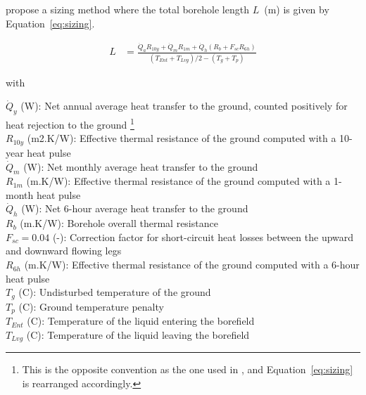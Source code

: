 \cite{Kavanaugh2014} propose a sizing method where the total borehole length $L$~(m) is given by Equation~\ref{eq:sizing}.

\begin{align}
    \label{eq:sizing}
    L &= \frac{\dot{Q}_a R_{10y} + \dot{Q}_m R_{1m} + \dot{Q}_h \left( R_b + F_{sc} R_{6h} \right)}{\left( T_{Ent} + T_{Lvg} \right) / 2 - \left( T_g + T_p \right)}
\end{align}

with

\begin{avec}
    $\dot{Q}_y$ (W): Net annual average heat transfer to the ground, counted positively for heat rejection to the ground%
    \footnote{This is the opposite convention as the one used in \cite{Kavanaugh2014}, and Equation~\ref{eq:sizing} is rearranged accordingly.}\\
    $R_{10y}$ (m2.K/W): Effective thermal resistance of the ground computed with a 10-year heat pulse \\
    $\dot{Q}_m$ (W): Net monthly average heat transfer to the ground\\
    $R_{1m}$ (m.K/W): Effective thermal resistance of the ground computed with a 1-month heat pulse \\
    $\dot{Q}_h$ (W): Net 6-hour average heat transfer to the ground\\
    $R_b$ (m.K/W): Borehole overall thermal resistance \\
    $F_{sc} = 0.04$ (-): Correction factor for short-circuit heat losses between the upward and downward flowing legs\\
    $R_{6h}$ (m.K/W): Effective thermal resistance of the ground computed with a 6-hour heat pulse \\
    $T_g$ (C): Undisturbed temperature of the ground \\
    $T_p$ (C): Ground temperature penalty \\
    $T_{Ent}$ (C): Temperature of the liquid entering the borefield \\
    $T_{Lvg}$ (C): Temperature of the liquid leaving the borefield \\
\end{avec}

